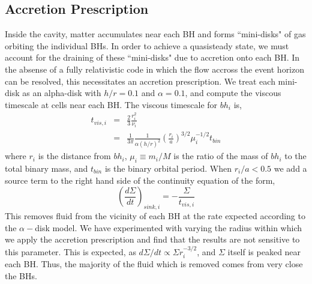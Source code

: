 \documentclass[apj]{emulateapj}
\begin{document}
           \subsection{Accretion Prescription}
           \label{sec:accretion}
           Inside the cavity, matter accumulates near each BH and forms ``mini-disks" of gas orbiting the individual BHs. In order to achieve a quasisteady state, we must account for the draining of these ``mini-disks" due to accretion onto each BH. In the absense of a fully relativistic code in which the flow accross the event horizon can be resolved, this necessitates an accretion prescription. We treat each mini-disk as an alpha-disk with $h/r = 0.1$ and $\alpha=0.1$, and compute the viscous timescale at cells near each BH. The viscous timescale for $bh_i$ is,
           \begin{eqnarray}
           \label{eq:tvis}
             t_{vis,i} &=& \frac{2}{3} \frac{r_i^2}{\nu_i} \nonumber\\
                                 &=& \frac{1}{3 \pi} \frac{1}{\alpha (h/r)^2} \left(\frac{r_i}{a}\right)^{3/2} \mu_i^{-1/2}t_{bin}
           \end{eqnarray}
           where $r_i$ is the distance from $bh_i$, $\mu_i \equiv m_i / M$ is the ratio of the mass of $bh_i$ to the total binary mass, and $t_{bin}$ is the binary orbital period. When $r_i/a < 0.5$  we add a source term to the right hand side of the continuity equation of the form,
           \begin{equation}
           \label{eq:rhosink}
             \left(\frac{d \Sigma}{dt}\right)_{sink,i} = - \frac{\Sigma}{t_{vis,i}}
           \end{equation}
           This removes fluid from the vicinity of each BH at the rate expected according to the $\alpha-$disk model.  We have experimented with varying the radius within which we apply the accretion prescription and find that the results are not sensitive to this parameter. This is expected, as $d \Sigma / dt \propto \Sigma r_i^{-3/2}$, and $\Sigma$ itself is peaked near each BH. Thus, the majority of the fluid which is removed comes from very close the BHs.
\end{document}
